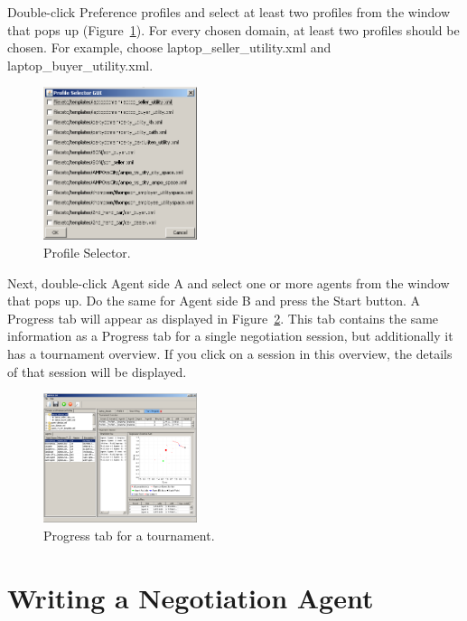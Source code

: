 \documentclass[]{article}
\begin{document}
{Double-click Preference profiles and select at least two profiles from the window that pops up (Figure~\ref{Fig:profile}). For every chosen domain, at least two profiles should be chosen. For example, choose laptop\_seller\_utility.xml and laptop\_buyer\_utility.xml.

\begin{figure}[htb]
	\centering
	\includegraphics[width=0.4\textwidth]{media/image17.png}
\caption{Profile Selector.}\label{Fig:profile}
\end{figure}

Next, double-click Agent side A and select one or more agents from the window that pops up. Do the same for Agent side B and press the Start button. A Progress tab will appear as displayed in Figure~\ref{Fig:tournament progress}. This tab contains the same information as a Progress tab for a single negotiation session, but additionally it has a tournament overview. If you click on a session in this overview, the details of that session will be displayed.

\begin{figure}[htb]
	\centering
	\includegraphics[width=0.4\textwidth]{media/image18.png}
\caption{Progress tab for a tournament.}\label{Fig:tournament progress}
\end{figure}

\section{Writing a Negotiation Agent}

}
\end{document}
